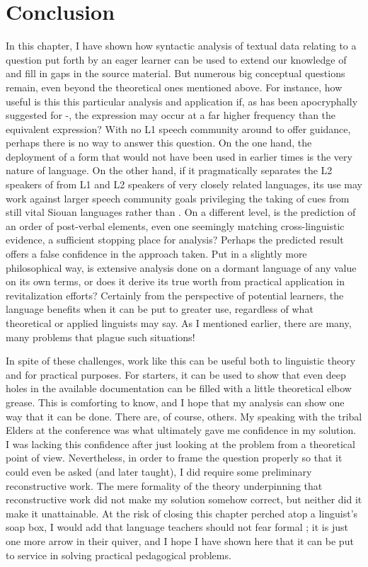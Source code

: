 \documentclass[output=paper]{LSP/langsci}
\begin{document}
\section{Conclusion}
	In this chapter, I have shown how syntactic analysis of textual data relating to a question put forth by an eager learner can be used to extend our knowledge of  and fill in gaps in the source material. But numerous big conceptual questions remain, even beyond the theoretical ones mentioned above. For instance, how useful is this this particular analysis and application if, as has been apocryphally suggested for -, the  expression may occur at a far higher frequency than the equivalent  expression? With no L1 speech community around to offer guidance, perhaps there is no way to answer this question. On the one hand, the deployment of a form that would not have been used in earlier times is the very nature of language. On the other hand, if it pragmatically separates the L2 speakers of  from L1 and L2 speakers of very closely related languages, its use may work against larger speech community goals privileging the taking of cues from still vital Siouan languages rather than . On a different level, is the prediction of an order of post-verbal elements, even one seemingly matching cross-linguistic evidence, a sufficient stopping place for analysis? Perhaps the predicted result offers a false confidence in the approach taken. Put in a slightly more philosophical way, is extensive analysis done on a dormant language of any value on its own terms, or does it derive its true worth from practical application in revitalization efforts? Certainly from the perspective of potential learners, the language benefits when it can be put to greater use, regardless of what theoretical or applied linguists may say. As I mentioned earlier, there are many, many problems that plague such situations!
	
	In spite of these challenges, work like this can be useful both to linguistic theory and for practical purposes. For starters, it can be used to show that even deep holes in the available documentation can be filled with a little theoretical elbow grease. This is comforting to know, and I hope that my analysis can show one way that it can be done. There are, of course, others. My speaking with the tribal Elders at the conference was what ultimately gave me confidence in my solution. I was lacking this confidence after just looking at the problem from a theoretical point of view. Nevertheless, in order to frame the question properly so that it could even be asked (and later taught), I did require some preliminary reconstructive work. The mere formality of the theory underpinning that reconstructive work did not make my solution somehow correct, but neither did it make it unattainable. At the risk of closing this chapter perched atop a linguist's soap box, I would add that language teachers should not fear formal ; it is just one more arrow in their quiver, and I hope I have shown here that it can be put to service in solving practical pedagogical problems.
\end{document}
